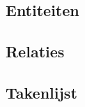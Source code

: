 

\maketitle

\subsection{Entiteiten}

        

\subsection{Relaties}

        

\subsection{Takenlijst}
        
